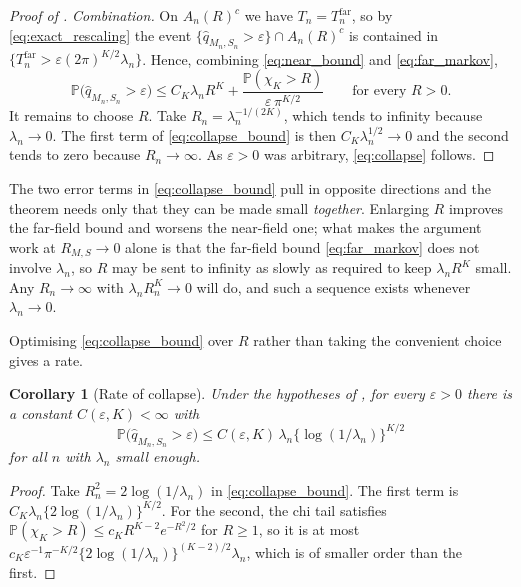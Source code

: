 \documentclass[11pt]{article}
\newtheorem{corollary}[corollary]{Corollary}
\theoremstyle{definition}
\newcommand{\Pp}{\mathbb{P}}
\begin{document}
\begin{proof}[Proof of ]
\emph{Combination.} On $A_n(R)^c$ we have $T_n=T_n^{\mathrm{far}}$, so by \eqref{eq:exact_rescaling} the event $\{\widehat q_{M_n,S_n}>\varepsilon\}\cap A_n(R)^c$ is contained in $\{T_n^{\mathrm{far}}>\varepsilon(2\pi)^{K/2}\lambda_n\}$. Hence, combining \eqref{eq:near_bound} and \eqref{eq:far_markov},
\begin{equation}\label{eq:collapse_bound}
\Pp\bigl(\widehat q_{M_n,S_n}>\varepsilon\bigr)
\le C_K\lambda_nR^K+\frac{\Pp(\chi_K>R)}{\varepsilon\,\pi^{K/2}}
\qquad\text{for every }R>0 .
\end{equation}
It remains to choose $R$. Take $R_n=\lambda_n^{-1/(2K)}$, which tends to infinity because $\lambda_n\to0$. The first term of \eqref{eq:collapse_bound} is then $C_K\lambda_n^{1/2}\to0$ and the second tends to zero because $R_n\to\infty$. As $\varepsilon>0$ was arbitrary, \eqref{eq:collapse} follows.
\end{proof}

The two error terms in \eqref{eq:collapse_bound} pull in opposite directions and the theorem needs only that they can be made small \emph{together}. Enlarging $R$ improves the far-field bound and worsens the near-field one; what makes the argument work at $R_{M,S}\to0$ alone is that the far-field bound \eqref{eq:far_markov} does not involve $\lambda_n$, so $R$ may be sent to infinity as slowly as required to keep $\lambda_nR^K$ small. Any $R_n\to\infty$ with $\lambda_nR_n^K\to0$ will do, and such a sequence exists whenever $\lambda_n\to0$.

Optimising \eqref{eq:collapse_bound} over $R$ rather than taking the convenient choice gives a rate.

\begin{corollary}[Rate of collapse]\label{cor:collapse_rate}
Under the hypotheses of , for every $\varepsilon>0$ there is a constant $C(\varepsilon,K)<\infty$ with
\begin{equation}\label{eq:collapse_rate}
\Pp\bigl(\widehat q_{M_n,S_n}>\varepsilon\bigr)
\le C(\varepsilon,K)\,\lambda_n\bigl\{\log(1/\lambda_n)\bigr\}^{K/2}
\end{equation}
for all $n$ with $\lambda_n$ small enough.
\end{corollary}

\begin{proof}
Take $R_n^2=2\log(1/\lambda_n)$ in \eqref{eq:collapse_bound}. The first term is $C_K\lambda_n\{2\log(1/\lambda_n)\}^{K/2}$. For the second, the chi tail satisfies $\Pp(\chi_K>R)\le c_KR^{K-2}e^{-R^2/2}$ for $R\ge1$, so it is at most $c_K\varepsilon^{-1}\pi^{-K/2}\{2\log(1/\lambda_n)\}^{(K-2)/2}\lambda_n$, which is of smaller order than the first.
\end{proof}
\end{document}
